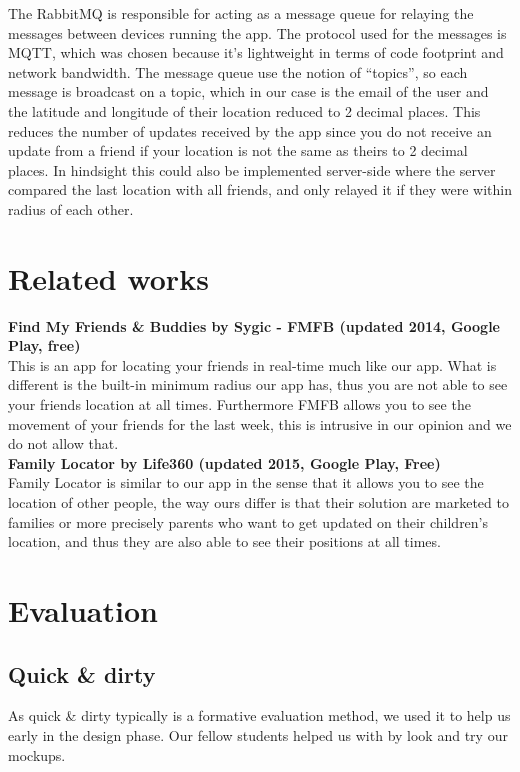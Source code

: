 \documentclass[runningheads,a4paper]{llncs}
\begin{document}
The RabbitMQ is responsible for acting as a message queue for relaying the messages between devices running the app. The protocol used for the messages is MQTT, which was chosen because it’s lightweight in terms of code footprint and network bandwidth. The message queue use the notion of “topics”, so each message is broadcast on a topic, which in our case is the email of the user and the latitude and longitude of their location reduced to 2 decimal places. This reduces the number of updates received by the app since you do not receive an update from a friend if your location is not the same as theirs to 2 decimal places. In hindsight this could also be implemented server-side where the server compared the last location with all friends, and only relayed it if they were within radius of each other.

 
\section{Related works}
\textbf{Find My Friends \& Buddies by Sygic - FMFB (updated 2014, Google Play, free)}\\
This is an app for locating your friends in real-time much like our app. What is different is the built-in minimum radius our app has, thus you are not able to see your friends location at all times. Furthermore FMFB allows you to see the movement of your friends for the last week, this is intrusive in our opinion and we do not allow that.\\

\textbf{Family Locator by Life360 (updated 2015, Google Play, Free)}\\
Family Locator is similar to our app in the sense that it allows you to see the location of other people, the way ours differ is that their solution are marketed to families or more precisely parents who want to get updated on their children's location, and thus they are also able to see their positions at all times. 


\section{Evaluation}
\subsection*{Quick \& dirty}
As quick \& dirty typically is a formative evaluation method, we used it to help us early in the design phase.  Our fellow students helped us with by look and try our mockups. 
\end{document}
